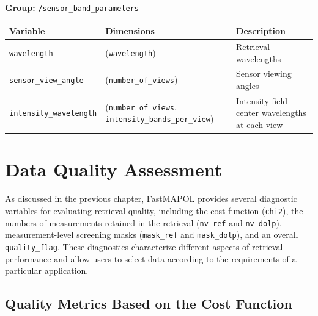 \documentclass[
  11pt,
  letterpaper,
]{scrreprt}
\begin{document}
\textbf{Group:} \texttt{/sensor\_band\_parameters}

\begin{longtable}[]{@{}
  >{\raggedright\arraybackslash}p{}
  >{\raggedright\arraybackslash}p{}
  >{\raggedright\arraybackslash}p{}@{}}
\toprule\noalign{}
\begin{minipage}[b]{\linewidth}\raggedright
Variable
\end{minipage} & \begin{minipage}[b]{\linewidth}\raggedright
Dimensions
\end{minipage} & \begin{minipage}[b]{\linewidth}\raggedright
Description
\end{minipage} \\
\midrule\noalign{}
\endhead
\bottomrule\noalign{}
\endlastfoot
\texttt{wavelength} & (\texttt{wavelength}) & Retrieval wavelengths \\
\texttt{sensor\_view\_angle} & (\texttt{number\_of\_views}) & Sensor
viewing angles \\
\texttt{intensity\_wavelength} & (\texttt{number\_of\_views},
\texttt{intensity\_bands\_per\_view}) & Intensity field center
wavelengths at each view \\
\end{longtable}


\chapter{Data Quality Assessment}\label{sec-data-quality}

As discussed in the previous chapter, FastMAPOL provides several
diagnostic variables for evaluating retrieval quality, including the
cost function (\texttt{chi2}), the numbers of measurements retained in
the retrieval (\texttt{nv\_ref} and \texttt{nv\_dolp}),
measurement-level screening masks (\texttt{mask\_ref} and
\texttt{mask\_dolp}), and an overall \texttt{quality\_flag}. These
diagnostics characterize different aspects of retrieval performance and
allow users to select data according to the requirements of a particular
application.

\section{Quality Metrics Based on the Cost
Function}\label{quality-metrics-based-on-the-cost-function}
\end{document}
